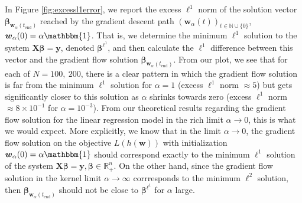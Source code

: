 \documentclass{article}
\begin{document}
In Figure \ref{fig:excessl1error}, we report the excess $\ell^1$ norm of the solution vector $\boldsymbol{\beta}_{\boldsymbol{w}_{\alpha}(t_{\text{end}})}$ reached by the gradient descent path $(\boldsymbol{w}_{\alpha}(t))_{t \in \mathbb{N}\cup \{0\}}$, $\boldsymbol{w}_{\alpha}(0) = \alpha \mathbbm{1}$. That is, we determine the minimum $\ell^1$ solution to the system $\boldsymbol{X} \boldsymbol{\beta} = \boldsymbol{y}$, denoted $\boldsymbol{\beta}^{\ell^1}$, and then calculate the $\ell^1$ difference between this vector and the gradient flow solution $\boldsymbol{\beta}_{\boldsymbol{w}_{\alpha}(t_{\text{end}})}$. From our plot, we see that for each of $N= 100, \ 200$, there is a clear pattern in which the gradient flow solution is far from the minimum $\ell^1$ solution for $\alpha =1$ (excess $\ell^1$ norm $\approx5$) but gets significantly closer to this solution as $\alpha$ shrinks towards zero (excess $\ell^1$ norm $\approx 8\times 10^{-1}$ for $\alpha = 10^{-3}$). From our theoretical results regarding the gradient flow solution for the linear regression model in the rich limit $\alpha \rightarrow 0$, this is what we would expect. More explicitly, we know that in the limit $\alpha \rightarrow 0$, the gradient flow solution on the objective $L(h(\boldsymbol{w}))$ with initialization $\boldsymbol{w}_{\alpha}(0) = \alpha \mathbbm{1}$ should correspond exactly to the minimum $\ell^1$ solution of the system $\boldsymbol{X} \boldsymbol{\beta} = \boldsymbol{y}, \boldsymbol{\beta} \in \mathbb{R}_+^n$. On the other hand, since the gradient flow solution in the kernel limit $\alpha \rightarrow \infty$ corrresponds to the minimum $\ell^2$ solution, then $\boldsymbol{\beta}_{\boldsymbol{w}_{\alpha}(t_{\text{end}})}$ should not be close to $\boldsymbol{\beta}^{\ell^1}$ for $\alpha$ large.
\end{document}

